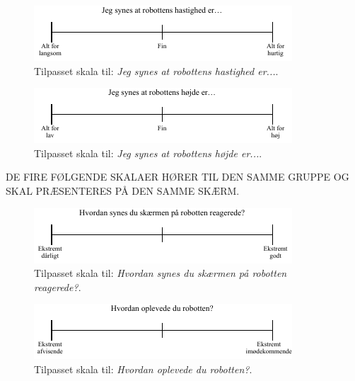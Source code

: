 %
\begin{figure}[H]
\centering
\includegraphics[width =\textwidth]{Figure/TilpasningAfSkalaer/TilpassetHastighedR} 
\caption{Tilpasset skala til: \textit{Jeg synes at robottens hastighed er...}.}
\label{fig:TilpasningHastighedR}
\end{figure}
\noindent
%
%
\begin{figure}[H]
\centering
\includegraphics[width =\textwidth]{Figure/TilpasningAfSkalaer/TilpassetHoejdeR} 
\caption{Tilpasset skala til: \textit{Jeg synes at robottens højde er...}.}
\label{fig:TilpasningHoejdeR}
\end{figure}
\noindent
%
DE FIRE FØLGENDE SKALAER HØRER TIL DEN SAMME GRUPPE OG SKAL PRÆSENTERES PÅ DEN SAMME SKÆRM.
%
\begin{figure}[H]
\centering
\includegraphics[width =\textwidth]{Figure/TilpasningAfSkalaer/TilpassetSkaermensReaktion} 
\caption{Tilpasset skala til: \textit{Hvordan synes du skærmen på robotten reagerede?}.}
\label{fig:TilpasningSkaermensReaktion}
\end{figure}
\noindent
%
%
\begin{figure}[H]
\centering
\includegraphics[width =\textwidth]{Figure/TilpasningAfSkalaer/TilpassetOplevede} 
\caption{Tilpasset skala til: \textit{Hvordan oplevede du robotten?}.}
\label{fig:TilpasningOplevede}
\end{figure}

